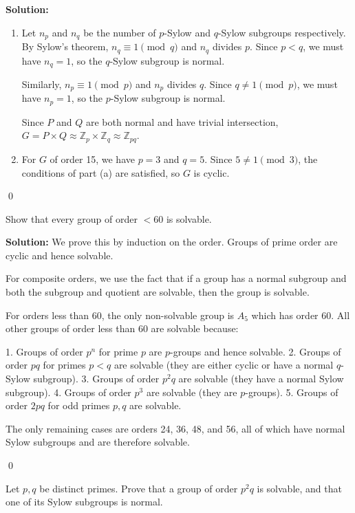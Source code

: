 \noindent\textbf{Solution:}
\begin{enumerate}[label=(\alph*)]
\item Let $n_p$ and $n_q$ be the number of $p$-Sylow and $q$-Sylow subgroups respectively. By Sylow's theorem, $n_q \equiv 1 \pmod{q}$ and $n_q$ divides $p$. Since $p < q$, we must have $n_q = 1$, so the $q$-Sylow subgroup is normal.

Similarly, $n_p \equiv 1 \pmod{p}$ and $n_p$ divides $q$. Since $q \neq 1 \pmod{p}$, we must have $n_p = 1$, so the $p$-Sylow subgroup is normal.

Since $P$ and $Q$ are both normal and have trivial intersection, $G = P \times Q \approx \mathbb{Z}_p \times \mathbb{Z}_q \approx \mathbb{Z}_{pq}$.

\item For $G$ of order 15, we have $p = 3$ and $q = 5$. Since $5 \neq 1 \pmod{3}$, the conditions of part (a) are satisfied, so $G$ is cyclic.
\end{enumerate}


\qed
\begin{problembox}
Show that every group of order $< 60$ is solvable.
\end{problembox}

\noindent\textbf{Solution:} We prove this by induction on the order. Groups of prime order are cyclic and hence solvable.

For composite orders, we use the fact that if a group has a normal subgroup and both the subgroup and quotient are solvable, then the group is solvable.

For orders less than 60, the only non-solvable group is $A_5$ which has order 60. All other groups of order less than 60 are solvable because:

1. Groups of order $p^n$ for prime $p$ are $p$-groups and hence solvable.
2. Groups of order $pq$ for primes $p < q$ are solvable (they are either cyclic or have a normal $q$-Sylow subgroup).
3. Groups of order $p^2q$ are solvable (they have a normal Sylow subgroup).
4. Groups of order $p^3$ are solvable (they are $p$-groups).
5. Groups of order $2pq$ for odd primes $p, q$ are solvable.

The only remaining cases are orders 24, 36, 48, and 56, all of which have normal Sylow subgroups and are therefore solvable.


\qed
\begin{problembox}
Let $p, q$ be distinct primes. Prove that a group of order $p^2q$ is solvable, and that one of its Sylow subgroups is normal.
\end{problembox}

